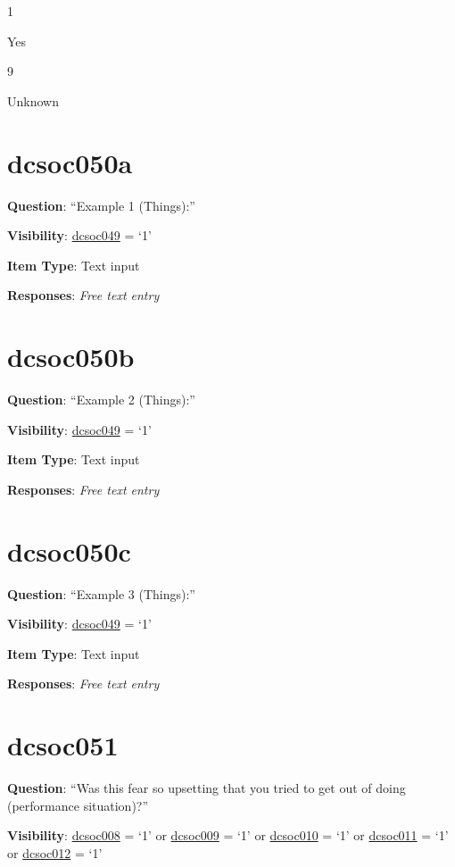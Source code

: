 \documentclass[]{book}
\begin{document}
1

Yes

9

Unknown

\hypertarget{dcsoc050a}{%
\section{dcsoc050a}\label{dcsoc050a}}

\textbf{Question}: ``Example 1 (Things):''

\textbf{Visibility}: \protect\hyperlink{dcsoc049}{dcsoc049} = `1'

\textbf{Item Type}: Text input

\textbf{Responses}: \emph{Free text entry}

\hypertarget{dcsoc050b}{%
\section{dcsoc050b}\label{dcsoc050b}}

\textbf{Question}: ``Example 2 (Things):''

\textbf{Visibility}: \protect\hyperlink{dcsoc049}{dcsoc049} = `1'

\textbf{Item Type}: Text input

\textbf{Responses}: \emph{Free text entry}

\hypertarget{dcsoc050c}{%
\section{dcsoc050c}\label{dcsoc050c}}

\textbf{Question}: ``Example 3 (Things):''

\textbf{Visibility}: \protect\hyperlink{dcsoc049}{dcsoc049} = `1'

\textbf{Item Type}: Text input

\textbf{Responses}: \emph{Free text entry}

\hypertarget{dcsoc051}{%
\section{dcsoc051}\label{dcsoc051}}

\textbf{Question}: ``Was this fear so upsetting that you tried to get out of doing (performance situation)?''

\textbf{Visibility}: \protect\hyperlink{dcsoc008}{dcsoc008} = `1' or \protect\hyperlink{dcsoc009}{dcsoc009} = `1' or \protect\hyperlink{dcsoc010}{dcsoc010} = `1' or \protect\hyperlink{dcsoc011}{dcsoc011} = `1' or \protect\hyperlink{dcsoc012}{dcsoc012} = `1'
\end{document}
